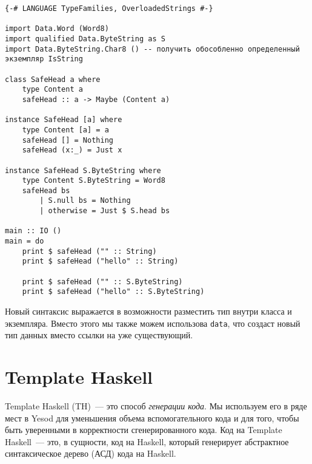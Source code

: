 \begin{lstlisting}
{-# LANGUAGE TypeFamilies, OverloadedStrings #-}

import Data.Word (Word8)
import qualified Data.ByteString as S
import Data.ByteString.Char8 () -- получить обособленно определенный экземпляр IsString

class SafeHead a where
    type Content a
    safeHead :: a -> Maybe (Content a)

instance SafeHead [a] where
    type Content [a] = a
    safeHead [] = Nothing
    safeHead (x:_) = Just x

instance SafeHead S.ByteString where
    type Content S.ByteString = Word8
    safeHead bs
        | S.null bs = Nothing
        | otherwise = Just $ S.head bs

main :: IO ()
main = do
    print $ safeHead ("" :: String)
    print $ safeHead ("hello" :: String)

    print $ safeHead ("" :: S.ByteString)
    print $ safeHead ("hello" :: S.ByteString)
\end{lstlisting}

Новый синтаксис выражается в возможности разместить тип внутри класса и экземпляра. Вместо этого мы также можем использова \lstinline'data', что создаст новый тип данных вместо ссылки на уже существующий.


\section{Template Haskell}

Template Haskell (TH)~--- это способ \emph{генерации кода}. Мы используем его в ряде мест в Yesod для уменьшения объема вспомогательного кода и для того, чтобы быть уверенными в корректности сгенерированного кода. Код на Template Haskell~--- это, в сущности, код на Haskell, который генерирует абстрактное синтаксическое дерево (АСД) кода на Haskell.

